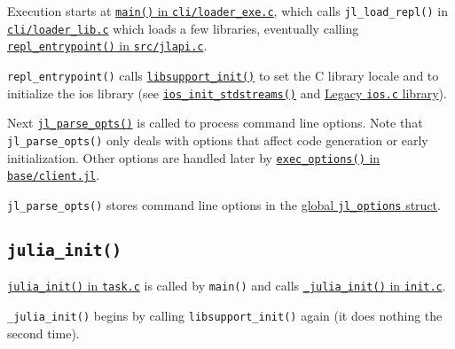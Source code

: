 Execution starts at \href{https://github.com/JuliaLang/julia/blob/master/cli/loader\_exe.c}{\texttt{main()} in \texttt{cli/loader\_exe.c}}, which calls \texttt{jl\_load\_repl()} in \href{https://github.com/JuliaLang/julia/blob/master/cli/loader\_lib.c}{\texttt{cli/loader\_lib.c}} which loads a few libraries, eventually calling \href{https://github.com/JuliaLang/julia/blob/master/src/jlapi.c}{\texttt{repl\_entrypoint()} in \texttt{src/jlapi.c}}.



\texttt{repl\_entrypoint()} calls \href{https://github.com/JuliaLang/julia/blob/master/src/support/libsupportinit.c}{\texttt{libsupport\_init()}} to set the C library locale and to initialize the {\textquotedbl}ios{\textquotedbl} library (see \href{https://github.com/JuliaLang/julia/blob/master/src/support/ios.c}{\texttt{ios\_init\_stdstreams()}} and \hyperlink{3841537160196121279}{Legacy \texttt{ios.c} library}).



Next \href{https://github.com/JuliaLang/julia/blob/master/src/jloptions.c}{\texttt{jl\_parse\_opts()}} is called to process command line options. Note that \texttt{jl\_parse\_opts()} only deals with options that affect code generation or early initialization. Other options are handled later by \href{https://github.com/JuliaLang/julia/blob/master/base/client.jl}{\texttt{exec\_options()} in \texttt{base/client.jl}}.



\texttt{jl\_parse\_opts()} stores command line options in the \href{https://github.com/JuliaLang/julia/blob/master/src/julia.h}{global \texttt{jl\_options} struct}.



\hypertarget{10951200599627901176}{}


\subsection{\texttt{julia\_init()}}



\href{https://github.com/JuliaLang/julia/blob/master/src/task.c}{\texttt{julia\_init()} in \texttt{task.c}} is called by \texttt{main()} and calls \href{https://github.com/JuliaLang/julia/blob/master/src/init.c}{\texttt{\_julia\_init()} in \texttt{init.c}}.



\texttt{\_julia\_init()} begins by calling \texttt{libsupport\_init()} again (it does nothing the second time).



